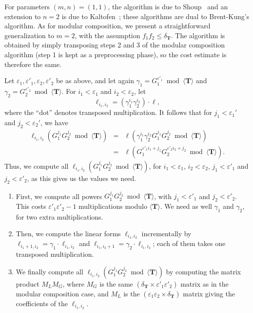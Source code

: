 \documentclass[12pt]{article}
\def\Tt {\ensuremath{\mathbf{T}}}
\begin{document}
For parameters $(m,n)=(1,1)$, the algorithm is due to
Shoup~\cite{Shoup99} and an extension to $n=2$ is due to
Kaltofen~\cite{Kaltofen00}; these algorithms are dual to Brent-Kung's
algorithm. As for modular composition, we present a straightforward
generalization to $m=2$, with the assumption $f_1 f_2 \le
\delta_\Tt$. The algorithm is obtained by simply transposing steps 2
and 3 of the modular composition algorithm (step 1 is kept as a
preprocessing phase), so the cost estimate is therefore the same.

Let $\varepsilon_1,\varepsilon'_1,\varepsilon_2,\varepsilon'_2$ be as
above, and let again $\gamma_1=G_1^{\varepsilon'_1} \bmod \langle \Tt
\rangle$ and $\gamma_2=G_2^{\varepsilon'_2} \bmod \langle \Tt
\rangle$. For $i_1 < \varepsilon_1$ and $i_2 < \varepsilon_2$, let
\[\ell_{i_1,i_2} = (\gamma_1^{i_1} \gamma_2^{i_2}) \cdot \ell,\]
where the ``dot'' denotes transposed multiplication. It follows that
for $j_1 < \varepsilon_1'$ and $j_2 < \varepsilon_2'$, we have
\[\begin{array}{rcl}
  \ell_{i_1,i_2} (G_1^{j_1}G_2^{j_2} \bmod \langle \Tt \rangle)
  &=&\ell(\gamma_1^{i_1}\gamma_2^{i_2} G_1^{j_1}G_2^{j_2} \bmod \langle \Tt \rangle)\\
  &=&\ell(G_1^{\varepsilon'_1 i_1 + j_1} G_2^{\varepsilon'_2 i_2 +
    j_2}\bmod \langle \Tt \rangle).
\end{array}\] Thus, we compute all $\ell_{i_1,i_2}
(G_1^{j_1}G_2^{j_2} \bmod \langle \Tt \rangle)$, for $i_1 <
\varepsilon_1$, $i_2 <\varepsilon_2$, $j_1 < \varepsilon'_1$ and $j_2
<\varepsilon'_2$, as this gives us the values we need.
\begin{enumerate}
\item First, we compute all powers $G_1^{j_1} G_2^{j_2} \bmod \langle
  \Tt \rangle$, with $j_1 < \varepsilon'_1$ and $j_2 <
  \varepsilon'_2$. This costs $\varepsilon'_1 \varepsilon'_2-1$
  multiplications modulo $\langle \Tt \rangle$.  We need as well
  $\gamma_1$ and $\gamma_2$, for two extra multiplications.
\item Then, we compute the linear forms $\ell_{i_1,i_2}$ incrementally
  by $\ell_{i_1+1,i_2} = \gamma_1 \cdot \ell_{i_1,i_2}$ and
  $\ell_{i_1,i_2+1} = \gamma_2 \cdot \ell_{i_1,i_2}$; each of them
  takes one transposed multiplication.
\item We finally compute all $\ell_{i_1,i_2} (G_1^{j_1}G_2^{j_2} \bmod
  \langle \Tt \rangle)$ by computing the matrix product $M_L M_G$,
  where $M_G$ is the same $(\delta_\Tt \times \varepsilon'_1
  \varepsilon'_2)$ matrix as in the modular composition case, and
  $M_L$ is the $(\varepsilon_1 \varepsilon_2 \times
  \delta_\Tt)$ matrix giving the coefficients of the
  $\ell_{i_1,i_2}$.
\end{enumerate}
\end{document}
